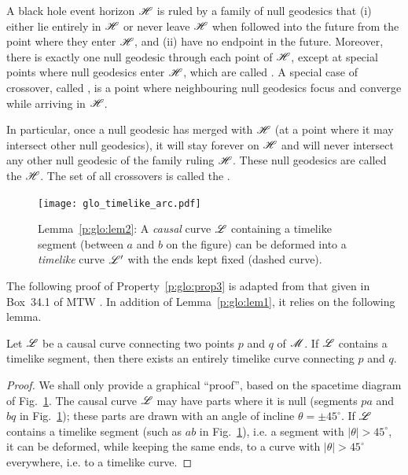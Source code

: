 \begin{prop}
\label{p:glo:prop3}
A black hole event horizon $\mathscr{H}$ is ruled by a family of null geodesics that (i) either lie entirely
in $\mathscr{H}$ or never leave $\mathscr{H}$ when followed into the future from the
point where they enter $\mathscr{H}$, and
(ii) have no endpoint in the future.
Moreover, there is exactly one null geodesic through each point of $\mathscr{H}$,
except at special points where null geodesics enter $\mathscr{H}$, which are
called . A special case
of crossover, called , is a point
where neighbouring null geodesics focus and converge while arriving in $\mathscr{H}$.
\end{prop}
In particular, once a null geodesic has
merged with $\mathscr{H}$ (at a point where it may intersect other null geodesics),
it will stay forever on $\mathscr{H}$ and will never intersect any other null geodesic
of the family ruling $\mathscr{H}$. These null geodesics are called the
 $\mathscr{H}$.
The set of all crossovers is called the 
\cite{Siino98a,Siino98b,Brill14}.

\begin{figure}
\centerline{\texttt{[image: glo\_timelike\_arc.pdf]}}
\caption[]{\label{f:glo:timelike_arc} \footnotesize
Lemma~\ref{p:glo:lem2}: A \emph{causal} curve $\mathscr{L}$ containing a timelike segment (between
$a$ and $b$ on the figure) can be deformed into a \emph{timelike} curve $\mathscr{L}'$
with the ends kept fixed (dashed curve).}
\end{figure}

The following proof of Property~\ref{p:glo:prop3}
is adapted from that given in Box~34.1 of MTW \cite{MisneTW73}.
In addition of Lemma~\ref{p:glo:lem1}, it relies on the following lemma.

\begin{lemma}
\label{p:glo:lem2}
Let $\mathscr{L}$ be a causal curve connecting two points $p$ and $q$
of $\mathscr{M}$. If $\mathscr{L}$ contains a timelike segment, then there exists an
entirely timelike curve connecting $p$ and $q$.
\end{lemma}
\begin{proof}
We shall only provide a graphical ``proof'', based on the spacetime diagram
of Fig.~\ref{f:glo:timelike_arc}. The causal curve $\mathscr{L}$ may have parts where it is null (segments $pa$ and $bq$ in Fig.~\ref{f:glo:timelike_arc}); these parts are drawn with
an angle of incline $\theta = \pm 45^\circ$.
If $\mathscr{L}$ contains a timelike segment (such as $ab$ in Fig.~\ref{f:glo:timelike_arc}), i.e. a segment with $|\theta|>45^\circ$,
it can be deformed, while keeping the same ends, to a curve with $|\theta|>45^\circ$
everywhere, i.e. to a timelike curve.
\end{proof}

